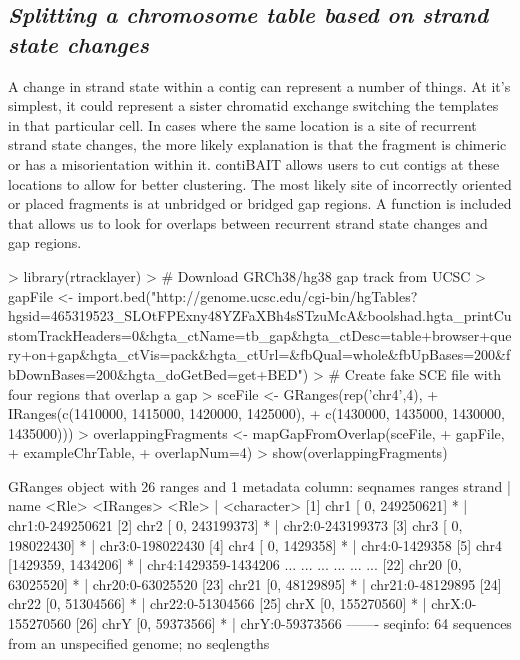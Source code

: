 \documentclass{article}
\begin{document}
\subsection{\textit{Splitting a chromosome table based on strand state changes}}
A change in strand state within a contig can represent a number of things. At it's simplest, it could represent a sister chromatid exchange switching the templates in that particular cell. In cases where the same location is a site of recurrent strand state changes, the more likely explanation is that the fragment is chimeric or has a misorientation within it. contiBAIT allows users to cut contigs at these locations to allow for better clustering. The most likely site of incorrectly oriented or placed fragments is at unbridged or bridged gap regions. A function is included that allows us to look for overlaps between recurrent strand state changes and gap regions.

\begin{Schunk}
\begin{Sinput}
> library(rtracklayer)
> # Download GRCh38/hg38 gap track from UCSC
> gapFile <- import.bed("http://genome.ucsc.edu/cgi-bin/hgTables?hgsid=465319523_SLOtFPExny48YZFaXBh4sSTzuMcA&boolshad.hgta_printCustomTrackHeaders=0&hgta_ctName=tb_gap&hgta_ctDesc=table+browser+query+on+gap&hgta_ctVis=pack&hgta_ctUrl=&fbQual=whole&fbUpBases=200&fbDownBases=200&hgta_doGetBed=get+BED")
> # Create fake SCE file with four regions that overlap a gap
> sceFile <- GRanges(rep('chr4',4), 
+ IRanges(c(1410000, 1415000, 1420000, 1425000), 
+ c(1430000, 1435000, 1430000, 1435000)))
> overlappingFragments <- mapGapFromOverlap(sceFile,
+  gapFile, 
+  exampleChrTable, 
+  overlapNum=4)
> show(overlappingFragments)
\end{Sinput}
\begin{Soutput}
GRanges object with 26 ranges and 1 metadata column:
       seqnames               ranges strand   |                 name
          <Rle>            <IRanges>  <Rle>   |          <character>
   [1]     chr1 [      0, 249250621]      *   |     chr1:0-249250621
   [2]     chr2 [      0, 243199373]      *   |     chr2:0-243199373
   [3]     chr3 [      0, 198022430]      *   |     chr3:0-198022430
   [4]     chr4 [      0,   1429358]      *   |       chr4:0-1429358
   [5]     chr4 [1429359,   1434206]      *   | chr4:1429359-1434206
   ...      ...                  ...    ... ...                  ...
  [22]    chr20       [0,  63025520]      *   |     chr20:0-63025520
  [23]    chr21       [0,  48129895]      *   |     chr21:0-48129895
  [24]    chr22       [0,  51304566]      *   |     chr22:0-51304566
  [25]     chrX       [0, 155270560]      *   |     chrX:0-155270560
  [26]     chrY       [0,  59373566]      *   |      chrY:0-59373566
  -------
  seqinfo: 64 sequences from an unspecified genome; no seqlengths
\end{Soutput}
\end{Schunk}
\end{document}
